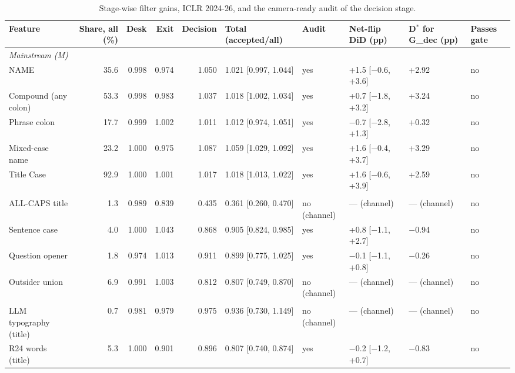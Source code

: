\begin{landscape}
\begin{table}[p]
\centering
\scriptsize
\caption{Stage-wise filter gains, ICLR 2024-26, and the camera-ready audit of the decision stage.}
\label{tab:filter}
\begin{adjustbox}{max width=\linewidth}
\begin{tabular}{l r r r r l l l l l}
\toprule
Feature & Share, all (\%) & Desk & Exit & Decision & Total (accepted/all) & Audit & Net-flip DiD (pp) & D$^{*}$ for G\_dec (pp) & Passes gate \\
\midrule
\multicolumn{10}{l}{\textit{Mainstream (M)}} \\
NAME & 35.6 & 0.998 & 0.974 & 1.050 & 1.021 [0.997, 1.044] & yes & +1.5 [$-$0.6, +3.6] & +2.92 & no \\
Compound (any colon) & 53.3 & 0.998 & 0.983 & 1.037 & 1.018 [1.002, 1.034] & yes & +0.7 [$-$1.8, +3.2] & +3.24 & no \\
Phrase colon & 17.7 & 0.999 & 1.002 & 1.011 & 1.012 [0.974, 1.051] & yes & $-$0.7 [$-$2.8, +1.3] & +0.32 & no \\
Mixed-case name & 23.2 & 1.000 & 0.975 & 1.087 & 1.059 [1.029, 1.092] & yes & +1.6 [$-$0.4, +3.7] & +3.29 & no \\
Title Case & 92.9 & 1.000 & 1.001 & 1.017 & 1.018 [1.013, 1.022] & yes & +1.6 [$-$0.6, +3.9] & +2.59 & no \\
\addlinespace
\multicolumn{10}{l}{\textit{Outsider (O)}} \\
ALL-CAPS title & 1.3 & 0.989 & 0.839 & 0.435 & 0.361 [0.260, 0.470] & no (channel) & --- (channel) & --- (channel) & no \\
Sentence case & 4.0 & 1.000 & 1.043 & 0.868 & 0.905 [0.824, 0.985] & yes & +0.8 [$-$1.1, +2.7] & $-$0.94 & no \\
Question opener & 1.8 & 0.974 & 1.013 & 0.911 & 0.899 [0.775, 1.025] & yes & $-$0.1 [$-$1.1, +0.8] & $-$0.26 & no \\
Outsider union & 6.9 & 0.991 & 1.003 & 0.812 & 0.807 [0.749, 0.870] & no (channel) & --- (channel) & --- (channel) & no \\
\addlinespace
\multicolumn{10}{l}{\textit{LLM-style (L)}} \\
LLM typography (title) & 0.7 & 0.981 & 0.979 & 0.975 & 0.936 [0.730, 1.149] & no (channel) & --- (channel) & --- (channel) & no \\
R24 words (title) & 5.3 & 1.000 & 0.901 & 0.896 & 0.807 [0.740, 0.874] & yes & $-$0.2 [$-$1.2, +0.7] & $-$0.83 & no \\

\end{tabular}
\end{adjustbox}
\end{table}
\end{landscape}
